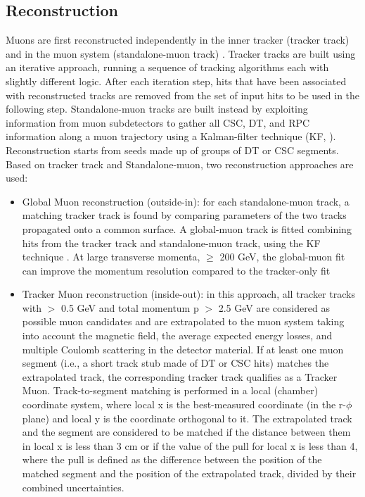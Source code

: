 \subsection{Reconstruction}
\label{sec:MuonReconstruction}
Muons are first reconstructed independently in the inner tracker (tracker track) and in the muon system (standalone-muon track) \cite{muons, muons_2}. Tracker tracks are built using an iterative approach, running a sequence of tracking algorithms each with slightly different logic. After each iteration step, hits that have been associated with reconstructed tracks are removed from the set of input hits to be used in the following step. Standalone-muon tracks are built instead by exploiting information from muon subdetectors to gather all CSC, DT, and RPC information along a muon trajectory using a Kalman-filter technique (KF, \cite{KF_muon}). Reconstruction starts from seeds made up of groups of DT or CSC segments. \\
Based on tracker track and Standalone-muon, two reconstruction approaches are used:
\begin{itemize}
\item Global Muon reconstruction (outside-in): for each standalone-muon track, a matching tracker track is found by comparing parameters of the two tracks propagated onto a common surface. A global-muon track is fitted combining hits from the tracker track and standalone-muon track, using the KF technique . At large transverse momenta, \pt  $\ge$ 200 GeV, the global-muon fit can improve the momentum resolution compared to the tracker-only fit
\item Tracker Muon reconstruction (inside-out): in this approach, all tracker tracks with \pt $>$ 0.5 GeV and total momentum p $>$ 2.5 GeV are considered as possible muon candidates and are extrapolated to the muon system taking into account the magnetic field, the average expected energy losses, and multiple Coulomb scattering in the detector material. If at least one muon segment (i.e., a short track stub made of DT or CSC hits) matches the extrapolated track, the corresponding tracker track qualifies as a Tracker Muon. Track-to-segment matching is performed in a local (chamber) coordinate system, where local x is the best-measured coordinate (in the r-$\phi$ plane) and local y is the coordinate orthogonal to it. The extrapolated track and the segment are considered to be matched if the distance between them in local x is less than 3 cm or if the value of the pull for local x is less than 4, where the pull is defined as the difference between the position of the matched segment and the position of the extrapolated track, divided by their combined uncertainties.
\end{itemize}
